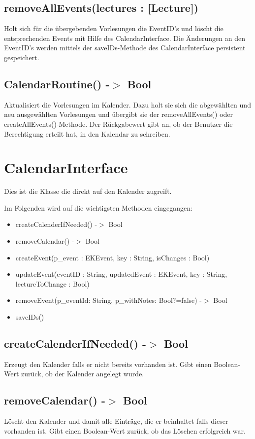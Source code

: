 \subsection[removeAllEvents]{removeAllEvents(lectures : [Lecture])}
Holt sich für die übergebenden Vorlesungen die EventID's und löscht die entsprechenden Events mit Hilfe des CalendarInterface.
Die Änderungen an den EventID's werden mittels der saveIDs-Methode des CalendarInterface persistent gespeichert.

\subsection[CalendarRoutine]{CalendarRoutine() -$>$ Bool}
Aktualisiert die Vorlesungen im Kalender. Dazu holt sie sich die abgewählten und neu ausgewählten Vorlesungen und übergibt sie der removeAllEvents() oder createAllEvents()-Methode. Der Rückgabewert gibt an, ob der Benutzer die Berechtigung erteilt hat, in den Kalendar zu schreiben.

\newpage
\section{CalendarInterface}
Dies ist die Klasse die direkt auf den Kalender zugreift. 

Im Folgenden wird auf die wichtigsten Methoden eingegangen:
\begin{itemize}
     \item createCalenderIfNeeded() -$>$ Bool
     \item removeCalendar() -$>$ Bool
     \item createEvent(p\_event : EKEvent, key : String, isChanges : Bool)
     \item updateEvent(eventID : String, updatedEvent : EKEvent, key : String, lectureToChange : Bool)
     \item removeEvent(p\_eventId: String, p\_withNotes: Bool?=false) -$>$ Bool
     \item saveIDs()
\end{itemize}

\subsection[createCalenderIfNeeded]{createCalenderIfNeeded() -$>$ Bool}
Erzeugt den Kalender falls er nicht bereits vorhanden ist. Gibt einen Boolean-Wert zurück, ob der Kalender angelegt wurde.

\subsection[removeCalendar]{removeCalendar() -$>$ Bool}
Löscht den Kalender und damit alle Einträge, die er beinhaltet falls dieser vorhanden ist. Gibt einen Boolean-Wert zurück, ob das Löschen erfolgreich war.

